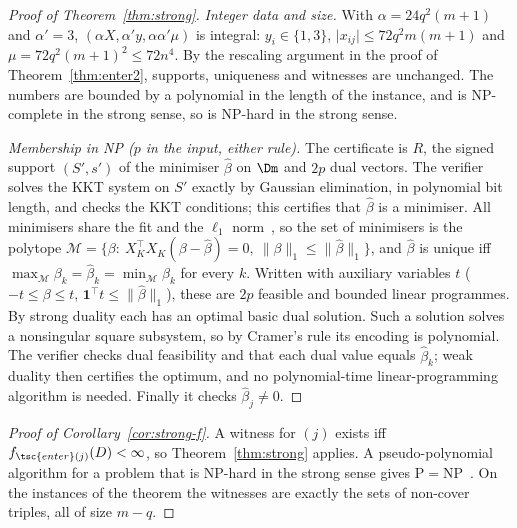 \begin{proof}[Proof of Theorem~\ref{thm:strong}]
\emph{Integer data and size.} With $\alpha=24q^2(m+1)$ and $\alpha'=3$, $(\alpha X,\alpha'y,\alpha\alpha'\mu)$ is integral: $y_i\in\{1,3\}$, $\lvert x_{ij}\rvert\le72q^2m(m+1)$ and $\mu=72q^2(m+1)^2\le72n^4$. By the rescaling argument in the proof of Theorem~\ref{thm:enter2}, supports, uniqueness and witnesses are unchanged. The numbers are bounded by a polynomial in the length of the instance, and  is NP-complete in the strong sense, so  is NP-hard in the strong sense.

\emph{Membership in NP ($p$ in the input, either rule).} The certificate is $R$, the signed support $(S',s')$ of the minimiser $\hat\beta$ on $\Dm$ and $2p$ dual vectors. The verifier solves the KKT system on $S'$ exactly by Gaussian elimination, in polynomial bit length, and checks the KKT conditions; this certifies that $\hat\beta$ is a minimiser. All minimisers share the fit and the $\ell_1$ norm~\citep{tibshirani2013}, so the set of minimisers is the polytope $\mathcal M=\{\beta:\ X_K^{\top}X_K(\beta-\hat\beta)=0,\ \lVert\beta\rVert_1\le\lVert\hat\beta\rVert_1\}$, and $\hat\beta$ is unique iff $\max_{\mathcal M}\beta_k=\hat\beta_k=\min_{\mathcal M}\beta_k$ for every $k$. Written with auxiliary variables $t$ ($-t\le\beta\le t$, $\mathbf 1^{\top}t\le\lVert\hat\beta\rVert_1$), these are $2p$ feasible and bounded linear programmes. By strong duality each has an optimal basic dual solution. Such a solution solves a nonsingular square subsystem, so by Cramer's rule its encoding is polynomial. The verifier checks dual feasibility and that each dual value equals $\hat\beta_k$; weak duality then certifies the optimum, and no polynomial-time linear-programming algorithm is needed. Finally it checks $\hat\beta_j\ne0$.
\end{proof}

\begin{proof}[Proof of Corollary~\ref{cor:strong-f}]
A witness for $(j)$ exists iff $f_{\tsc{enter}(j)}(D)<\infty$, so Theorem~\ref{thm:strong} applies. A pseudo-polynomial algorithm for a problem that is NP-hard in the strong sense gives P${}={}$NP~\citep{garey1979}. On the instances of the theorem the witnesses are exactly the sets of non-cover triples, all of size $m-q$.
\end{proof}
